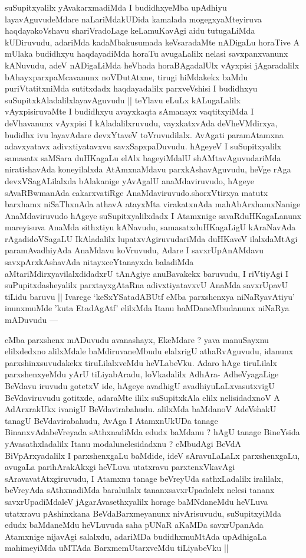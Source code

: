 \begin{artha}
suSupitxyalilx yAvakarxmadiMda I budidhxyeMba upAdhiyu
layavAguvudeMdare naLariMdakUDida kamalada mogegxyaMteyiruva
haqdayakoVshavu shariVradoLage keLamuKavAgi aidu tutugaLiMda
kUDiruvudu, adariMda kadaMbakusumada keVsaradaMte nADigaLu horaTive A
mUlaka budidhxyu haqdayadiMda horaTu avugaLalilx nelasi savxpanxvanunx
kANuvudu, adeV nADigaLiMda heVhada horaBAgadalUlx vAyxpisi
jAgaradalilx bAhayxparxpaMcavanunx noVDutAtxne, tirugi hiMdakekx baMdu
puriVtatitxniMda sutitxdadx haqdayadalilx parxveVshisi I budidhxyu
suSupitxkAladalilxlayavAguvudu || teYlavu eLuLx kALugaLalilx
vAyxpisiruvaMte I budidhxyu avayxkaqta sAmanayx vaqtitxyiMda I
deVhavanunx vAyxpisi I kAladalilxruvudu, vayxkatxvAda deVheVMdirxya,
budidhx ivu layavAdare devxYtaveV toVruvudilalx. AvAgati paramAtamxna
adavxyatavx adivxtiyatavxvu savxSapxpaDuvudu. hAgeyeV I suSupitxyalilx
samasatx saMSara duHKagaLu elAlx bageyiMdalU shAMtavAguvudariMda
niratishavAda koneyilalxda AtAmxnaMdavu parxkAshavAguvudu, heVge rAga
devxVSagALilalxda bAlakanige yAvAgalU  anaMdaviruvudo, hAgeye
sAvaRBwmanAda cakarxvatiRge AnaMdaviruvudo.shorxVtirxya  matutx
barxhamx niSaThxnAda athavA atayxMta virakatxnAda 
mahAbArxhamxNanige AnaMdaviruvudo hAgeye suSupitxyalilxdadx I
Atamxnige savaRduHKagaLanunx mareyisuva AnaMda sithxtiyu kANavudu,
samasatxduHKagaLigU kAraNavAda rAgadidoVSagaLU IkAladalilx
lupatxvAgiruvudariMda duHKaveV ilalxdaMtAgi paramAvadhiyAda AnaMdavu
koVruvudu, Adare I savxrUpAnAMdavu savxpArxkAshavAda nitayxceYtanayxda
baladiMda aMtariMdirxyavilalxdidadxrU tAnAgiye anuBavakekx baruvudu, I
riVtiyAgi I suPupitxdasheyalilx parxtayxgAtaRna adivxtiyatavxvU AnaMda
savxrUpavU tiLidu baruvu || Ivarege `keSxYSatadABUtf eMba parxshenxya
niNaRyavAtiyu' inunxmuMde 'kuta EtadAgAtf' elilxMda Itanu
baMDaneMbudanunx niNaRya mADuvudu ---
\end{artha}


\begin{artha}
eMba parxshenx mADuvudu avanashayx, EkeMdare ? yava manuSayxnu
elilxdedxno alilxMdale baMdiruvaneMbudu elalxrigU athaRvAguvudu,
idanunx parxshinxsuvudakekx tiruLilalxveMdu heVLabeVku. Adaro hAge
tiruLilalx parxshenxyeMdu yArU tiLiyabAradu, loVkadalilx AdhAra-
AdheVyagaLige BeVdavu iruvudu gotetxV ide, hAgeye avadhigU
avadhiyuLaLxvasutxvigU BeVdaviruvudu gotitxde, adaraMte ililx suSupitxkAla
elilx nelisidadxnoV A AdArxrakUkx ivanigU BeVdavirabahudu. alilxMda
baMdanoV AdeVshakU tanagU BeVdavirabahudu, AvAga  I AtamxnUkUDa
tanage BinanxvAdabeVreyada sAthxnadiMda edudx baMdanu ? hAgU tanage
BineYsida yAvasathxladalilx Itanu modalunelesidadxnu ? eMbudAgi BeVdA
BiVpArxyadalilx I parxshenxgaLu baMdide, ideV sAravuLaLaLx
parxshenxgaLu, avugaLa parihArakAkxgi heVLuva utatxravu
parxtenxVkavAgi sAravavatAtxgiruvudu, I Atamxnu tanage beVreyUda
sathxLadalilx iralilalx, beVreyAda sAthxnadiMda baraluilalx
tananxsavxrUpadalelx nelesi tananx savxrUpadiMdaleV
jAgarAvasethxyalilx horage baMNdaneMdu heVLuva utatxravu pAshinxkana
BeVdaBarxmeyanunx nivArisuvudu, suSupitxyiMda edudx baMdaneMdu
heVLuvuda saha pUNaR aKaMDa savxrUpanAda Atamxnige nijavAgi salalxdu,
adariMDa budidhxmuMtAda upAdhigaLa mahimeyiMda uMTAda
BarxmemUtarxveMdu tiLiyabeVku ||
\end{artha}

